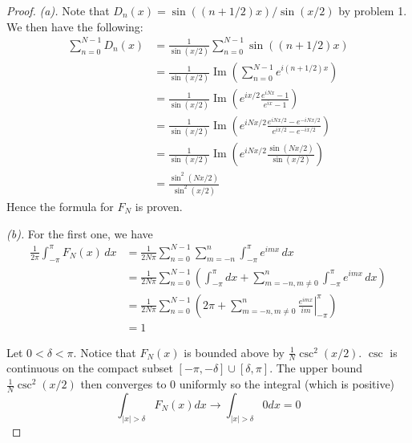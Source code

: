 \documentclass{article}
\renewcommand{\Im}{\operatorname{Im}}
\theoremstyle{definition} %
\numberwithin{thm}{section} %
\theoremstyle{definition} %
\begin{document}
\begin{proof}
\textit{(a).} Note that $D_n(x) = \sin((n + 1/2)x)/\sin(x/2)$ by
problem 1. We then have the following:
\begin{align*}
    \sum_{n = 0}^{N - 1} D_n(x)
    &= \frac{1}{\sin(x/2)}\sum_{n = 0}^{N - 1} \sin((n + 1/2)x) \\
    &= \frac{1}{\sin(x/2)}
    \Im\left(\sum_{n = 0}^{N - 1} e^{i(n + 1/2)x}\right) \\
    &= \frac{1}{\sin(x/2)} \Im\left(e^{ix/2}
    \frac{e^{iNx} - 1}{e^{ix} - 1}\right) \\
    &= \frac{1}{\sin(x/2)} \Im\left(e^{iNx/2}
    \frac{e^{iNx/2} - e^{-iNx/2}}{e^{ix/2} - e^{-ix/2}}\right) \\
    &= \frac{1}{\sin(x/2)} \Im\left(e^{iNx/2}
    \frac{\sin(Nx/2)}{\sin(x/2)}\right) \\
    &= \frac{\sin^2(Nx/2)}{\sin^2(x/2)}
\end{align*}
Hence the formula for $F_N$ is proven.

\textit{(b).} For the first one, we have
\begin{align*}
    \frac{1}{2\pi} \int_{-\pi}^{\pi} F_N(x) \,dx
    &= \frac{1}{2N\pi}
    \sum_{n=0}^{N-1} \sum_{m=-n}^{n} \int_{-\pi}^{\pi} e^{imx} \,dx \\
    &= \frac{1}{2N\pi}\sum_{n=0}^{N-1} \left(
    \int_{-\pi}^{\pi} dx + \sum_{m=-n, m \neq 0}^{n} 
    \int_{-\pi}^{\pi} e^{imx} \,dx\right) \\
    &= \frac{1}{2N\pi}\sum_{n=0}^{N-1} \left(2\pi 
    + \sum_{m=-n, m \neq 0}^{n} 
    \left.\frac{e^{imx}}{im} \right|_{-\pi}^{\pi}\right) \\
    &= 1
\end{align*}

Let $0 < \delta < \pi$.
Notice that $F_N(x)$ is bounded above by $\frac{1}{N}\csc^2(x/2)$. $\csc$
is continuous on the compact subset $[-\pi, -\delta] \cup [\delta, \pi]$.
The upper bound $\frac{1}{N}\csc^2(x/2)$ then converges to 0 uniformly
so the integral (which is positive) 
\[
    \int_{|x| > \delta} F_N(x)dx \to \int_{|x| > \delta} 0dx = 0
\]


\end{proof}
\end{document}
